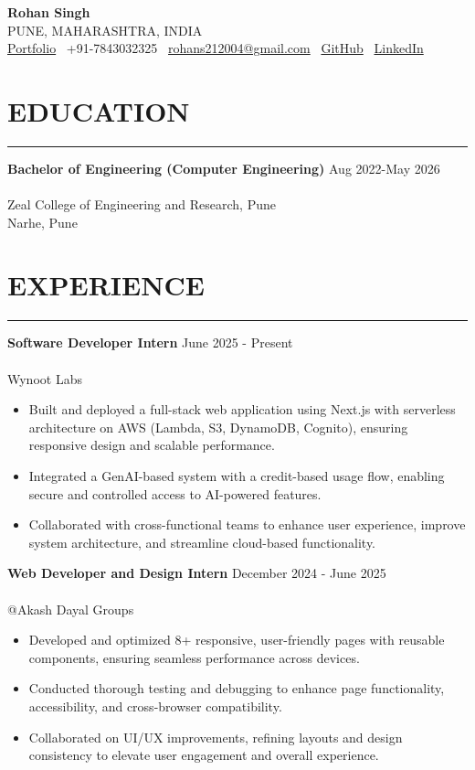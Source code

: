 \documentclass[a4paper,10pt]{article}
\newcommand{\experienceitem}[2]{%
    \noindent\textbf{#1} \hfill #2 \\
    \vspace{-0.9em}
}
\newcommand{\sectionline}[1]{%
    \par\noindent\rule[0.5ex]{\linewidth}{0.5pt}\vspace{-0.3em}%
}
\begin{document}
\begin{center}
\textbf{\Huge Rohan Singh}\\

   
    PUNE, MAHARASHTRA, INDIA \\
    \href{https://rohans21.vercel.app/}{Portfolio} \textbar\ 
    +91-7843032325 \textbar\ 
    \href{mailto:rohans212004@gmail.com}{rohans212004@gmail.com} \textbar\ 
    \href{https://github.com/Rohs21}{GitHub} \textbar\ 
    \href{https://www.linkedin.com/in/rohan-singh-8872322b8/}{LinkedIn}
\end{center}

\vspace{-0.6em}
\section*{EDUCATION}
\sectionline{}
\experienceitem{Bachelor of Engineering (Computer Engineering)}{Aug 2022-May 2026} \\
Zeal College of Engineering and Research, Pune \\
Narhe, Pune

\vspace{-0.1em}
\section*{EXPERIENCE}
\sectionline{}
\experienceitem{Software Developer Intern}{June 2025 - Present} \\
Wynoot Labs
\begin{itemize}[leftmargin=0.5in]
    \item Built and deployed a full-stack web application using Next.js with serverless architecture on AWS (Lambda, S3, DynamoDB, Cognito), ensuring responsive design and scalable performance.
    \item Integrated a GenAI-based system with a credit-based usage flow, enabling secure and controlled access to AI-powered features.
    \item Collaborated with cross-functional teams to enhance user experience, improve system architecture, and streamline cloud-based functionality.
\end{itemize}




\experienceitem{Web Developer and Design Intern}{December 2024 - June 2025} \\
@Akash Dayal Groups
\begin{itemize}[leftmargin=0.5in]
    \item Developed and optimized 8+ responsive, user-friendly pages with reusable components, ensuring seamless performance across devices.
    \item Conducted thorough testing and debugging to enhance page functionality, accessibility, and cross-browser compatibility.
    \item Collaborated on UI/UX improvements, refining layouts and design consistency to elevate user engagement and overall experience.
\end{itemize}
\end{document}
